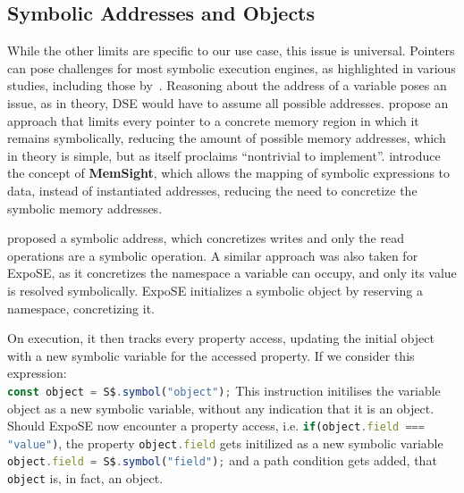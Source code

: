 \subsection{Symbolic Addresses and Objects}
\label{sec:sym-obj}
While the other limits are specific to our use case, this issue is universal. Pointers can pose challenges for most symbolic execution engines, as highlighted in various studies, including those by~\citet{cha_unleashing_2012,coppa_rethinking_2017,elkarablieh_precise_2009}.
Reasoning about the address of a variable poses an issue, as in theory, DSE would have to assume all possible addresses. 
\citet{elkarablieh_precise_2009} propose an approach that limits every pointer to a concrete memory region in which it remains symbolically, reducing the amount of possible memory addresses, which in theory is simple, but as itself proclaims “nontrivial to implement”. 
\citet{coppa_rethinking_2017} introduce the concept of \textbf{MemSight}, which allows the mapping of symbolic expressions to data, instead of instantiated addresses, reducing the need to concretize the symbolic memory addresses. 

\citet{cha_unleashing_2012} proposed a symbolic address, which concretizes writes and only the read operations are a symbolic operation. 
A similar approach was also taken for ExpoSE, as it concretizes the namespace a variable can occupy, and only its value is resolved symbolically.
ExpoSE initializes a symbolic object by reserving a namespace, concretizing it.


On execution, it then tracks every property access, updating the initial object with a new symbolic variable for the accessed property. 
If we consider this expression:\\
\lstinline[language=JavaScript]{const object = S$.symbol("object");}
This instruction initilises the variable object as a new symbolic variable, without any indication that it is an object. 
Should ExpoSE now encounter a property access, i.e.
\lstinline[language=JavaScript]{if(object.field === "value")},
the property \lstinline[language=JavaScript]{object.field} gets initilized as a new symbolic variable
\lstinline[language=JavaScript]{object.field = S$.symbol("field");} 
and a path condition gets added, that \lstinline[language=JavaScript]{object} is, in fact, an object.\cite{loring_systematic_2021}

